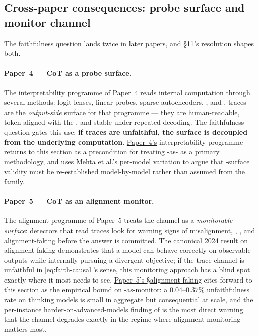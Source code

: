 \subsection{Cross-paper consequences: probe surface and monitor channel}
\label{sec:faith-cross-paper}

The faithfulness question lands twice in later papers, and §11's
resolution shapes both.

\paragraph{Paper~4 — CoT as a probe surface.}
The interpretability programme of Paper~4 reads internal computation
through several methods: logit lenses, linear probes, sparse
autoencoders, , and .  traces are
the \emph{output-side}  surface for that programme — they are
human-readable, token-aligned with the , and stable
under repeated decoding. The faithfulness question gates this use:
\textbf{if traces are unfaithful, the  surface is decoupled from
the underlying computation}. \hyperref[P4-sec:introduction]{Paper~4's} interpretability programme returns to
this section as a precondition for treating -as- as a primary
methodology, and uses Mehta et al.'s per-model variation to argue that
-surface validity must be re-established model-by-model rather
than assumed from the family.

\paragraph{Paper~5 — CoT as an alignment monitor.}
The alignment programme of Paper~5 treats the  channel as a
\emph{monitorable surface}: detectors that read traces look for
warning signs of misalignment, , , and
alignment-faking before the answer is committed. The
canonical 2024 result on alignment-faking
\citep{greenblatt2024-alignment-faking} demonstrates that a model can
behave correctly on observable outputs while internally pursuing a
divergent objective; if the trace channel is unfaithful in
\cref{eq:faith-causal}'s sense, this monitoring approach has a blind
spot exactly where it most needs to see. \hyperref[P5-sec:alignment-faking]{Paper~5's §alignment-faking} cites
forward to this section as the empirical bound on -as-monitor: a
$0.04$--$0.37\%$ unfaithfulness rate on thinking models
\citep[abstract]{arcuschin2025-cot-wild} is small in aggregate but
consequential at scale, and the per-instance harder-on-advanced-models
finding of \citet{shen2025-faithcot-bench} is the most direct warning
that the channel degrades exactly in the regime where alignment
monitoring matters most.

